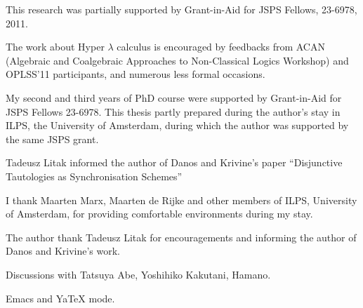 \begin{acknowledge}
 This research was partially supported by
 Grant-in-Aid for JSPS Fellows, 23-6978, 2011.

 The work about Hyper $\lambda$ calculus is encouraged by feedbacks from
 ACAN (Algebraic and
 Coalgebraic
 Approaches to
 Non-Classical Logics Workshop) and OPLSS'11 participants,
 and numerous less formal occasions.

 My second and third years of PhD course were
 supported by Grant-in-Aid for JSPS Fellows 23-6978.
 This thesis partly prepared during the author's stay in
 ILPS, the University of Amsterdam, during which the author was supported
 by the same JSPS grant.

 Tadeusz Litak informed the author of Danos and Krivine's paper
 ``Disjunctive Tautologies as Synchronisation Schemes''

 I thank Maarten Marx, Maarten de Rijke and other members of ILPS,
 University of Amsterdam, for providing
 comfortable environments during my stay.

 The author thank Tadeusz Litak for encouragements and
 informing the author of Danos and Krivine's work.

 Discussions with Tatsuya Abe, Yoshihiko Kakutani,  Hamano.

 Emacs and YaTeX mode.
\end{acknowledge}
